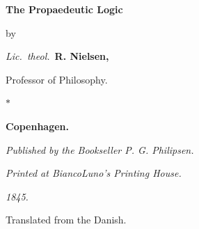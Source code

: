 \documentclass[12pt]{book}
\begin{document}

\frontmatter

\begin{titlepage}
\centering
\vspace*{3.0cm}
{\Huge\bfseries The Propaedeutic Logic\par}
\vspace{1.6cm}
{\small by\par}
\vspace{0.7cm}
{\large\textit{Lic.\ theol.}\ {\LARGE\bfseries R. Nielsen,}\par}
\vspace{0.4cm}
{\large Professor of Philosophy.\par}
\vspace{1.8cm}
{\Large $\ast$\par}
\vspace{1.8cm}
{\Large\bfseries Copenhagen.\par}
\vspace{0.6cm}
{\emph{Published by the Bookseller P. G. Philipsen.}\par}
\vspace{0.35cm}
{\small\emph{Printed at BiancoLuno's Printing House.}\par}
\vspace{1.2cm}
{\large\textit{1845.}\par}
\vspace{0.8cm}
{\small Translated from the Danish.\par}
\end{titlepage}

\end{document}

